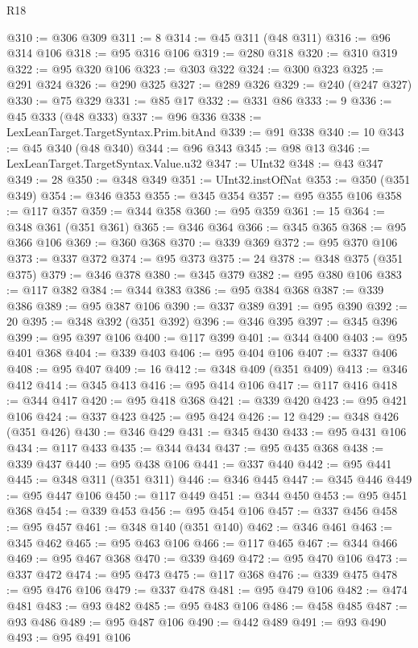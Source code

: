 \begin{lexlean}{R18}
\begin{coremodule}
@310 := @306 @309
@311 := 8
@314 := @45 @311 (@48 @311)
@316 := @96 @314 @106
@318 := @95 @316 @106
@319 := @280 @318
@320 := @310 @319
@322 := @95 @320 @106
@323 := @303 @322
@324 := @300 @323
@325 := @291 @324
@326 := @290 @325
@327 := @289 @326
@329 := @240 (@247 @327)
@330 := @75 @329
@331 := @85 @17
@332 := @331 @86
@333 := 9
@336 := @45 @333 (@48 @333)
@337 := @96 @336
@338 := LexLeanTarget.TargetSyntax.Prim.bitAnd
@339 := @91 @338
@340 := 10
@343 := @45 @340 (@48 @340)
@344 := @96 @343
@345 := @98 @13
@346 := LexLeanTarget.TargetSyntax.Value.u32
@347 := UInt32
@348 := @43 @347
@349 := 28
@350 := @348 @349
@351 := UInt32.instOfNat
@353 := @350 (@351 @349)
@354 := @346 @353
@355 := @345 @354
@357 := @95 @355 @106
@358 := @117 @357
@359 := @344 @358
@360 := @95 @359
@361 := 15
@364 := @348 @361 (@351 @361)
@365 := @346 @364
@366 := @345 @365
@368 := @95 @366 @106
@369 := @360 @368
@370 := @339 @369
@372 := @95 @370 @106
@373 := @337 @372
@374 := @95 @373
@375 := 24
@378 := @348 @375 (@351 @375)
@379 := @346 @378
@380 := @345 @379
@382 := @95 @380 @106
@383 := @117 @382
@384 := @344 @383
@386 := @95 @384 @368
@387 := @339 @386
@389 := @95 @387 @106
@390 := @337 @389
@391 := @95 @390
@392 := 20
@395 := @348 @392 (@351 @392)
@396 := @346 @395
@397 := @345 @396
@399 := @95 @397 @106
@400 := @117 @399
@401 := @344 @400
@403 := @95 @401 @368
@404 := @339 @403
@406 := @95 @404 @106
@407 := @337 @406
@408 := @95 @407
@409 := 16
@412 := @348 @409 (@351 @409)
@413 := @346 @412
@414 := @345 @413
@416 := @95 @414 @106
@417 := @117 @416
@418 := @344 @417
@420 := @95 @418 @368
@421 := @339 @420
@423 := @95 @421 @106
@424 := @337 @423
@425 := @95 @424
@426 := 12
@429 := @348 @426 (@351 @426)
@430 := @346 @429
@431 := @345 @430
@433 := @95 @431 @106
@434 := @117 @433
@435 := @344 @434
@437 := @95 @435 @368
@438 := @339 @437
@440 := @95 @438 @106
@441 := @337 @440
@442 := @95 @441
@445 := @348 @311 (@351 @311)
@446 := @346 @445
@447 := @345 @446
@449 := @95 @447 @106
@450 := @117 @449
@451 := @344 @450
@453 := @95 @451 @368
@454 := @339 @453
@456 := @95 @454 @106
@457 := @337 @456
@458 := @95 @457
@461 := @348 @140 (@351 @140)
@462 := @346 @461
@463 := @345 @462
@465 := @95 @463 @106
@466 := @117 @465
@467 := @344 @466
@469 := @95 @467 @368
@470 := @339 @469
@472 := @95 @470 @106
@473 := @337 @472
@474 := @95 @473
@475 := @117 @368
@476 := @339 @475
@478 := @95 @476 @106
@479 := @337 @478
@481 := @95 @479 @106
@482 := @474 @481
@483 := @93 @482
@485 := @95 @483 @106
@486 := @458 @485
@487 := @93 @486
@489 := @95 @487 @106
@490 := @442 @489
@491 := @93 @490
@493 := @95 @491 @106

\end{coremodule}
\end{lexlean}
